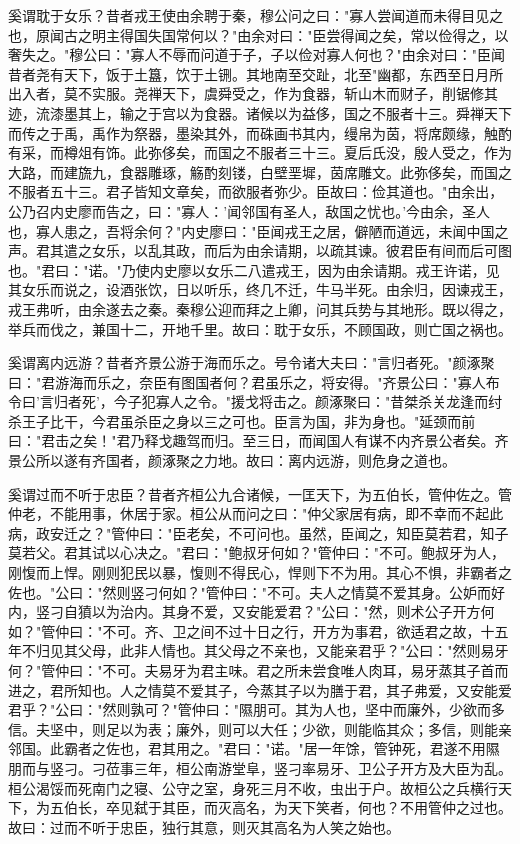 \documentclass[]{article}
\begin{document}
奚谓耽于女乐？昔者戎王使由余聘于秦，穆公问之曰："寡人尝闻道而未得目见之也，原闻古之明主得国失国常何以？"由余对曰："臣尝得闻之矣，常以俭得之，以奢失之。"穆公曰："寡人不辱而问道于子，子以俭对寡人何也？"由余对曰："臣闻昔者尧有天下，饭于土簋，饮于土铏。其地南至交趾，北至"幽都，东西至日月所出入者，莫不实服。尧禅天下，虞舜受之，作为食器，斩山木而财子，削锯修其迹，流漆墨其上，输之于宫以为食器。诸候以为益侈，国之不服者十三。舜禅天下而传之于禹，禹作为祭器，墨染其外，而硃画书其内，缦帛为茵，将席颇缘，触酌有采，而樽俎有饰。此弥侈矣，而国之不服者三十三。夏后氏没，殷人受之，作为大路，而建旒九，食器雕琢，觞酌刻镂，白壁垩墀，茵席雕文。此弥侈矣，而国之不服者五十三。君子皆知文章矣，而欲服者弥少。臣故曰：俭其道也。"由余出，公乃召内史廖而告之，曰："寡人：'闻邻国有圣人，敌国之忧也。'今由余，圣人也，寡人患之，吾将余何？"内史廖曰："臣闻戎王之居，僻陋而道远，未闻中国之声。君其遣之女乐，以乱其政，而后为由余请期，以疏其谏。彼君臣有间而后可图也。"君曰："诺。"乃使内史廖以女乐二八遣戎王，因为由余请期。戎王许诺，见其女乐而说之，设酒张饮，日以听乐，终几不迁，牛马半死。由余归，因谏戎王，戎王弗听，由余遂去之秦。秦穆公迎而拜之上卿，问其兵势与其地形。既以得之，举兵而伐之，兼国十二，开地千里。故曰：耽于女乐，不顾国政，则亡国之祸也。

奚谓离内远游？昔者齐景公游于海而乐之。号令诸大夫曰："言归者死。"颜涿聚曰："君游海而乐之，奈臣有图国者何？君虽乐之，将安得。"齐景公曰："寡人布令曰'言归者死'，今子犯寡人之令。"援戈将击之。颜涿聚曰："昔桀杀关龙逢而纣杀王子比干，今君虽杀臣之身以三之可也。臣言为国，非为身也。"延颈而前曰："君击之矣！"君乃释戈趣驾而归。至三日，而闻国人有谋不内齐景公者矣。齐景公所以遂有齐国者，颜涿聚之力地。故曰：离内远游，则危身之道也。

奚谓过而不听于忠臣？昔者齐桓公九合诸候，一匡天下，为五伯长，管仲佐之。管仲老，不能用事，休居于家。桓公从而问之曰："仲父家居有病，即不幸而不起此病，政安迁之？"管仲曰："臣老矣，不可问也。虽然，臣闻之，知臣莫若君，知子莫若父。君其试以心决之。"君曰："鲍叔牙何如？"管仲曰："不可。鲍叔牙为人，刚愎而上悍。刚则犯民以暴，愎则不得民心，悍则下不为用。其心不惧，非霸者之佐也。"公曰："然则竖刁何如？"管仲曰："不可。夫人之情莫不爱其身。公妒而好内，竖刁自獖以为治内。其身不爱，又安能爱君？"公曰："然，则术公子开方何如？"管仲曰："不可。齐、卫之间不过十日之行，开方为事君，欲适君之故，十五年不归见其父母，此非人情也。其父母之不亲也，又能亲君乎？"公曰："然则易牙何？"管仲曰："不可。夫易牙为君主味。君之所未尝食唯人肉耳，易牙蒸其子首而进之，君所知也。人之情莫不爱其子，今蒸其子以为膳于君，其子弗爱，又安能爱君乎？"公曰："然则孰可？"管仲曰："隰朋可。其为人也，坚中而廉外，少欲而多信。夫坚中，则足以为表；廉外，则可以大任；少欲，则能临其众；多信，则能亲邻国。此霸者之佐也，君其用之。"君曰："诺。"居一年馀，管钟死，君遂不用隰朋而与竖刁。刁莅事三年，桓公南游堂阜，竖刁率易牙、卫公子开方及大臣为乱。桓公渴馁而死南门之寝、公守之室，身死三月不收，虫出于户。故桓公之兵横行天下，为五伯长，卒见弑于其臣，而灭高名，为天下笑者，何也？不用管仲之过也。故曰：过而不听于忠臣，独行其意，则灭其高名为人笑之始也。
\end{document}
